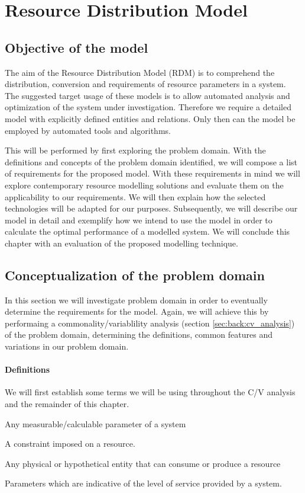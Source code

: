  

\newcommand{\rdmid}{2}
\chapter{Resource Distribution Model}
\label{ch:rdm}
\section{Objective of the model}
The aim of the Resource Distribution Model (RDM) is to comprehend the distribution, conversion and requirements of resource parameters in a system. The suggested target usage of these models is to allow automated analysis and optimization of the system under investigation. Therefore we require a detailed model with explicitly defined entities and relations. Only then can the model be employed by automated tools and algorithms.

This will be performed by first exploring the problem domain. With the definitions and concepts of the problem domain identified, we will compose a list of requirements for the proposed model. With these requirements in mind we will explore contemporary resource modelling solutions and evaluate them on the applicability to our requirements. We will then explain how the selected technologies will be adapted for our purposes. Subsequently, we will describe our model in detail and exemplify how we intend to use the model in order to calculate the optimal performance of a modelled system. We will conclude this chapter with an evaluation of the proposed modelling technique.

\section{Conceptualization of the problem domain}
\label{sec:cv_analysis}
In this section we will investigate problem domain in order to eventually determine the requirements for the model. Again, we will achieve this by performaing a commonality/variablility analysis (section \ref{sec:back:cv_analysis}) of the problem domain, determining the definitions, common features and variations in our problem domain.

\subsubsection{Definitions}
We will first establish some terms we will be using throughout the C/V analysis and the remainder of this chapter. 
\begin{description}
\nospace
\item[Resource:] Any measurable/calculable parameter of a system
\item[Resource constraint:] A constraint imposed on a resource.
\item[Component:] Any physical or hypothetical entity that can consume or produce a resource
\item[Quality of Service (QoS):] Parameters which are indicative of the level of service provided by a system.
\end{description}
